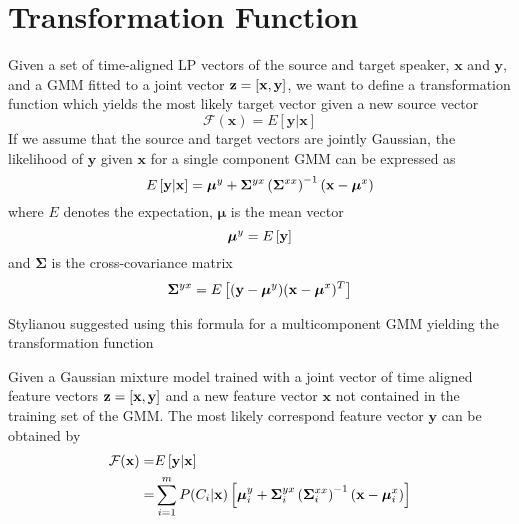 \section{Transformation Function} %
\label{sec:transformation_function}
Given a set of time-aligned LP vectors of the source and target speaker, $\mathbf{x}$ and $\mathbf{y}$, and a GMM fitted to a joint vector $\mathbf{z}=\left[\mathbf{x},\mathbf{y}\right]$, we want to define a transformation function which yields the most likely target vector given a new source vector
\newcommand{\fff}{\mathcal F}
\begin{equation}
	\fff(\mathbf{x}) = E[\mathbf{y}\vert \mathbf{x}]
\end{equation}
If we assume that the source and target vectors are jointly Gaussian, the likelihood of $\mathbf{y}$ given $\mathbf{x}$ for a single component GMM can be expressed as \cite{kay93}
\begin{equation}
	E \left[\mathbf{y}\vert \mathbf{x}\right] = \boldsymbol{\mu}^y + \mathbf{\Sigma}^{yx} \left(\mathbf{\Sigma}^{xx}\right)^{-1} (\mathbf{x}-\boldsymbol{\mu}^x)
\end{equation}
where $E$ denotes the expectation, $\boldsymbol{\mu}$ is the mean vector
\begin{equation}
	\boldsymbol{\mu}^y = E\left[\mathbf{y}\right]
\end{equation}
and $\mathbf{\Sigma}$ is the cross-covariance matrix
\begin{equation}
	\mathbf{\Sigma}^{yx} = E \left[(\mathbf{y}-\boldsymbol{\mu}^y)(\mathbf{x}-\boldsymbol{\mu}^x)^T\right]
\end{equation}

Stylianou \etal \cite{stylianou95} suggested using this formula for a multicomponent GMM yielding the transformation function
\begin{definition}
	Given a Gaussian mixture model trained with a joint vector of time aligned feature vectors $\mathbf{z} = \left[\mathbf{x},\mathbf{y}\right]$ and a new feature vector $\mathbf{x}$ not contained in the training set of the GMM. The most likely correspond feature vector $\mathbf{y}$ can be obtained by
	\begin{equation}
		\label{eq:transformation_function}
		\begin{split}
			\fff(\mathbf{x}) =& E \sbrackets{\mathbf{y}\vert \mathbf{x}}\\
			=& \sum_{i=1}^{m}P(C_i \vert \mathbf{x})\sbrackets{ \boldsymbol{\mu}_i^y + \mathbf{\Sigma}_i^{yx} \pbrackets{\mathbf{\Sigma}_i^{xx}}^{-1} (\mathbf{x}-\boldsymbol{\mu}_i^x)}
		\end{split}
	\end{equation}
\end{definition}

